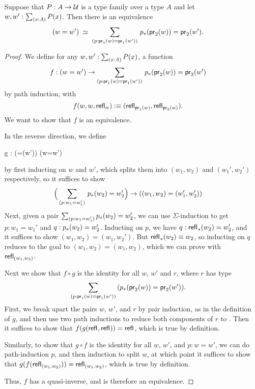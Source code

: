 \begin{thm}\label{thm:path-sigma}
Suppose that $P:A\to\mathcal{U}$ is a type family over a type $A$ and let $w,w':\sm{x:A}P(x)$. Then there is an equivalence
\begin{equation*}
\eqvspaced{(w=w')}{\dsm{p:\proj{1}(w)=\proj{1}(w')} \trans{p}{\proj{2}(w)}=\proj{2}(w')}.
\end{equation*}
\end{thm}

\begin{proof}
We define for any $w,w':\sm{x:A}P(x)$, a function
\begin{equation*}
f: (w=w') \to \dsm{p:\proj{1}(w)=\proj{1}(w')} \trans{p}{\proj{2}(w)}=\proj{2}(w')
\end{equation*}
by path induction, with
\begin{equation*}
f(w,w,\mathsf{refl}_{w})\vcentcolon\equiv(\mathsf{refl}_{\mathsf{pr}_{1}(w)},\mathsf{refl}_{\mathsf{pr}_{2}(w)}).
\end{equation*}
We want to show that $f$ is an equivalence.

In the reverse direction, we define
\begin{narrowmultline*}
  g :  
      \Big(=(w')\Big)
      \to
      \narrowbreak
      (w=w')
\end{narrowmultline*}
by first inducting on $w$ and $w'$, which splits them into $(w_1,w_2)$ and
$(w_1',w_2')$ respectively, so it suffices to show 
\begin{equation*}
\Big(\dsm{p:w_1 = w_1'}\trans{p}{w_2}=w_2'\Big) \to ((w_1,w_2)=(w_1',w_2'))
\end{equation*}
Next, given a pair $\sm{p:w_1 = w_1'}\trans{p}{w_2}=w_2'$, we can
use $\Sigma$-induction to get $p : w_1 = w_1'$ and $q :
{p}_{*}\mathopen{}\left({w_2}\right)\mathclose{}=w_2'$.  Inducting on $p$, we have $q :
{\mathsf{refl}_{}}_{*}\mathopen{}\left({w_2}\right)\mathclose{}=w_2'$, and it suffices to show 
$(w_1,w_2)=(w_1,w_2')$.  But ${\mathsf{refl}_{}}_{*}\mathopen{}\left({w_2}\right)\mathclose{} \equiv w_2$, so
inducting on $q$ reduces to the goal to 
$(w_1,w_2)=(w_1,w_2)$, which we can prove with $\mathsf{refl}_{(w_1,w_2)}$.  

Next we show that $f \circ g$ is the identity for all $w$, $w'$ and
$r$, where $r$ has type
\[\dsm{p:\proj{1}(w)=\proj{1}(w')} (\trans{p}{\proj{2}(w)}=\proj{2}(w')).\]
First, we break apart the pairs $w$, $w'$, and $r$ by pair induction, as in the
definition of $g$, and then use two path inductions to reduce both components
of $r$ to .  Then it suffices to show that 
$f (g(\mathsf{refl}_{},\mathsf{refl}_{})) = \mathsf{refl}_{}$, which is true by definition.

Similarly, to show that $g \circ f$ is the identity for all $w$, $w'$,
and $p : w = w'$, we can do path-induction $p$, and then induction to
split $w$, at which point it suffices to show that
$g(f (\mathsf{refl}_{(w_1,w_2)})) = \mathsf{refl}_{(w_1,w_2)}$, which is true by
definition.

Thus, $f$ has a quasi-inverse, and is therefore an equivalence.  
\end{proof}


